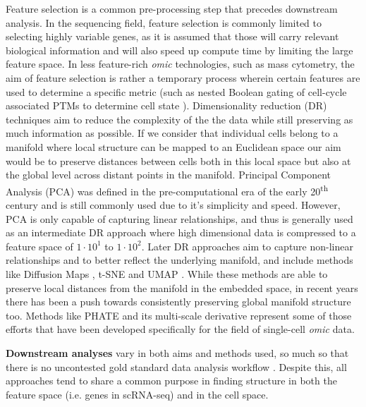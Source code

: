Feature selection is a common pre-processing step that precedes downstream analysis. In the sequencing field, feature selection is commonly limited to selecting highly variable genes, as it is assumed that those will carry relevant biological information and will also speed up compute time by limiting the large feature space. In less feature-rich \emph{omic} technologies, such as mass cytometry, the aim of feature selection is rather a temporary process wherein certain features are used to determine a specific metric (such as nested Boolean gating of cell-cycle associated PTMs to determine cell state \cite{behbehani_single-cell_2012,qin_cell-type-specific_2020}).
Dimensionality reduction (DR) techniques aim to reduce the complexity of the the data while still preserving as much information as possible. If we consider that individual cells belong to a manifold where local structure can be mapped to an Euclidean space our aim would be to preserve distances between cells both in this local space but also at the global level across distant points in the manifold. Principal Component Analysis (PCA) \cite{pearson_liii_1901,jolliffe_principal_2016} was defined in the pre-computational era of the early 20\textsuperscript{th} century and is still commonly used due to it's simplicity and speed. However, PCA is only capable of capturing linear relationships, and thus is generally used as an intermediate DR approach where high dimensional data is compressed to a feature space of \(1\cdot10^1\) to \(1\cdot10^2\). Later DR approaches aim to capture non-linear relationships and to better reflect the underlying manifold, and include methods like Diffusion Maps \cite{coifman_diffusion_2006}, t-SNE \cite{van_der_maaten_visualizing_2008} and UMAP \cite{mcinnes_umap_2020}. While these methods are able to preserve local distances from the manifold in the embedded space, in recent years there has been a push towards consistently preserving global manifold structure too. Methods like PHATE \cite{moon_visualizing_2019} and its multi-scale derivative \cite{kuchroo_multiscale_2020} represent some of those efforts that have been developed specifically for the field of single-cell \emph{omic} data.

\textbf{Downstream analyses} vary in both aims and methods used, so much so that there is no uncontested gold standard data analysis workflow \cite{slovin_single-cell_2021}. Despite this, all approaches tend to share a common purpose in finding structure in both the feature space (i.e. genes in scRNA-seq) and in the cell space.

